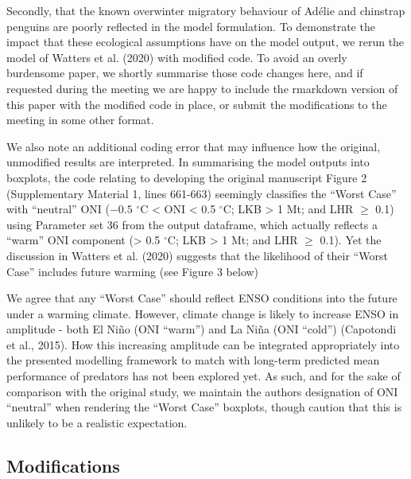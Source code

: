 \documentclass[]{elsarticle} %
\begin{document}
Secondly, that the known overwinter migratory behaviour of Adélie and
chinstrap penguins are poorly reflected in the model formulation. To
demonstrate the impact that these ecological assumptions have on the
model output, we rerun the model of Watters et al. (2020) with modified
code. To avoid an overly burdensome paper, we shortly summarise those
code changes here, and if requested during the meeting we are happy to
include the rmarkdown version of this paper with the modified code in
place, or submit the modifications to the meeting in some other format.

We also note an additional coding error that may influence how the
original, unmodified results are interpreted. In summarising the model
outputs into boxplots, the code relating to developing the original
manuscript Figure 2 (Supplementary Material 1, lines 661-663) seemingly
classifies the ``Worst Case'' with ``neutral'' ONI (\({-0.5}\)
\(^{\circ}\)C \textless{} ONI \textless{} 0.5 \(^{\circ}\)C; LKB
\textgreater{} 1 Mt; and LHR \(\geqslant\) 0.1) using Parameter set 36
from the output dataframe, which actually reflects a ``warm'' ONI
component (\textgreater{} 0.5 \(^{\circ}\)C; LKB \textgreater{} 1 Mt;
and LHR \(\geqslant\) 0.1). Yet the discussion in Watters et al. (2020)
suggests that the likelihood of their ``Worst Case'' includes future
warming (see Figure 3 below)

We agree that any ``Worst Case'' should reflect ENSO conditions into the
future under a warming climate. However, climate change is likely to
increase ENSO in amplitude - both El Niño (ONI ``warm'') and La Niña
(ONI ``cold'') (Capotondi et al., 2015). How this increasing amplitude
can be integrated appropriately into the presented modelling framework
to match with long-term predicted mean performance of predators has not
been explored yet. As such, and for the sake of comparison with the
original study, we maintain the authors designation of ONI ``neutral''
when rendering the ``Worst Case'' boxplots, though caution that this is
unlikely to be a realistic expectation.

\hypertarget{modifications}{%
\subsection{Modifications}\label{modifications}}
\end{document}
